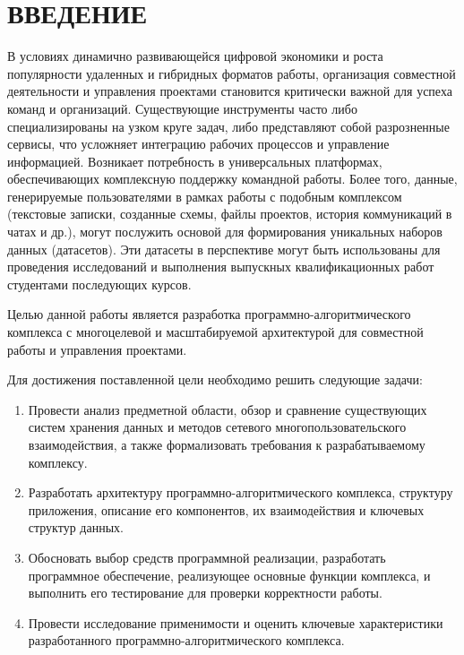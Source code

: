 \chapter*{ВВЕДЕНИЕ}

В условиях динамично развивающейся цифровой экономики и роста популярности удаленных и гибридных форматов работы, организация совместной деятельности и управления проектами становится критически важной для успеха команд и организаций. 
Существующие инструменты часто либо специализированы на узком круге задач, либо представляют собой разрозненные сервисы, что усложняет интеграцию рабочих процессов и управление информацией. 
Возникает потребность в универсальных платформах, обеспечивающих комплексную поддержку командной работы.
Более того, данные, генерируемые пользователями в рамках работы с подобным комплексом (текстовые записки, созданные схемы, файлы проектов, история коммуникаций в чатах и др.), могут послужить основой для формирования уникальных наборов данных (датасетов). 
Эти датасеты в перспективе могут быть использованы для проведения исследований и выполнения выпускных квалификационных работ студентами последующих курсов.

Целью данной работы является разработка программно-алгоритмического комплекса с многоцелевой и масштабируемой архитектурой для совместной работы и управления проектами.

Для достижения поставленной цели необходимо решить следующие задачи:

\begin{enumerate}[wide=12.5mm, leftmargin=12.5mm]
    \item Провести анализ предметной области, обзор и сравнение существующих систем хранения данных и методов сетевого многопользовательского взаимодействия, а также формализовать требования к разрабатываемому комплексу.
    \item Разработать архитектуру программно-алгоритмического комплекса, структуру приложения, описание его компонентов, их взаимодействия и ключевых структур данных.
    \item Обосновать выбор средств программной реализации, разработать программное обеспечение, реализующее основные функции комплекса, и выполнить его тестирование для проверки корректности работы.
    \item Провести исследование применимости и оценить ключевые характеристики разработанного программно-алгоритмического комплекса.
\end{enumerate}